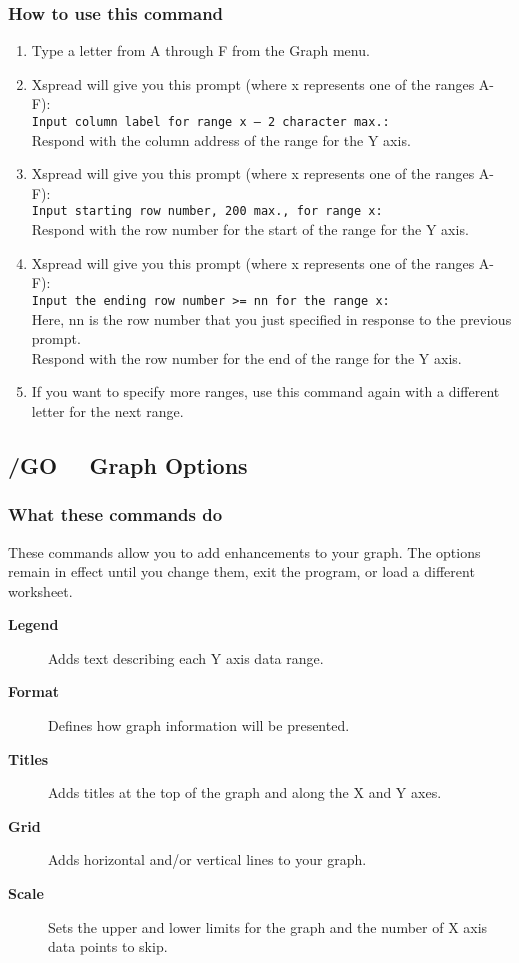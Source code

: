 \subsubsection*{How to use this command}
\begin{enumerate}
\item{Type a letter from A through F from the Graph menu.}
\item{Xspread will give you this prompt (where x represents one of the
        ranges A-F):\\
        {\tt Input column label for range x -- 2 character max.:} \\
        Respond with the column address of the range for the Y axis.}
\item{Xspread will give you this prompt (where x represents one of the
        ranges A-F):\\
        {\tt Input starting row number, 200 max., for range x:} \\
        Respond with the row number for the start of the range for the Y
        axis.}
\item{Xspread will give you this prompt (where x represents one of the
        ranges A-F):\\
        {\tt Input the ending row number >= nn for the range x:} \\
        Here, nn is the row number that you just specified in response to
        the previous prompt.\\
        Respond with the row number for the end of the range for the Y
        axis.}
\item{If you want to specify more ranges, use this command again with a
        different letter for the next range.}
\end{enumerate}

\subsection*{/GO \ \     Graph Options}

\subsubsection*{What these commands do}
These commands allow you to add enhancements to your graph.  The 
options remain in effect until you change them, exit the program, or 
load a different worksheet.

\begin{description}
\item[{\bf Legend  }]{Adds text describing each Y axis data range.}
\item[{\bf Format  }]{Defines how graph information will be presented.}
\item[{\bf Titles  }]{Adds titles at the top of the graph and
        along the X and Y axes.}
\item[{\bf Grid}]{    Adds horizontal and/or vertical lines to
        your graph.}
\item[{\bf Scale   }]{Sets the upper and lower limits for the graph and
        the number of X axis data points to skip.}
\end{description}
        
